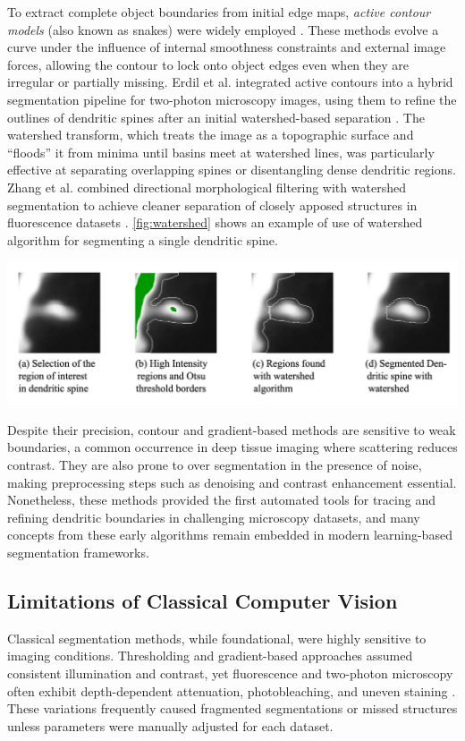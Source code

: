 To extract complete object boundaries from initial edge maps, \textit{active contour models} (also known as snakes) were widely employed \cite{Kass_1988}. These methods evolve a curve under the influence of internal smoothness constraints and external image forces, allowing the contour to lock onto object edges even when they are irregular or partially missing. Erdil et al. integrated active contours into a hybrid segmentation pipeline for two-photon microscopy images, using them to refine the outlines of dendritic spines after an initial watershed-based separation \cite{Erdil_2013}. The watershed transform, which treats the image as a topographic surface and “floods” it from minima until basins meet at watershed lines, was particularly effective at separating overlapping spines or disentangling dense dendritic regions. Zhang et al. combined directional morphological filtering with watershed segmentation to achieve cleaner separation of closely apposed structures in fluorescence datasets \cite{Zhang_2016}. \autoref{fig:watershed} shows an example of use of watershed algorithm for segmenting a single dendritic spine.

\begin{center}
    \includegraphics[width=.8\textwidth]{figures/07_watershed.png} 
    \label{fig:watershed}
\end{center}

Despite their precision, contour and gradient-based methods are sensitive to weak boundaries, a common occurrence in deep tissue imaging where scattering reduces contrast. They are also prone to over segmentation in the presence of noise, making preprocessing steps such as denoising and contrast enhancement essential. Nonetheless, these methods provided the first automated tools for tracing and refining dendritic boundaries in challenging microscopy datasets, and many concepts from these early algorithms remain embedded in modern learning-based segmentation frameworks.

\subsection{Limitations of Classical Computer Vision}
Classical segmentation methods, while foundational, were highly sensitive to imaging conditions. Thresholding and gradient-based approaches assumed consistent illumination and contrast, yet fluorescence and two-photon microscopy often exhibit depth-dependent attenuation, photobleaching, and uneven staining \cite{Okabe_2020, Roszkowska_2016}. These variations frequently caused fragmented segmentations or missed structures unless parameters were manually adjusted for each dataset.

